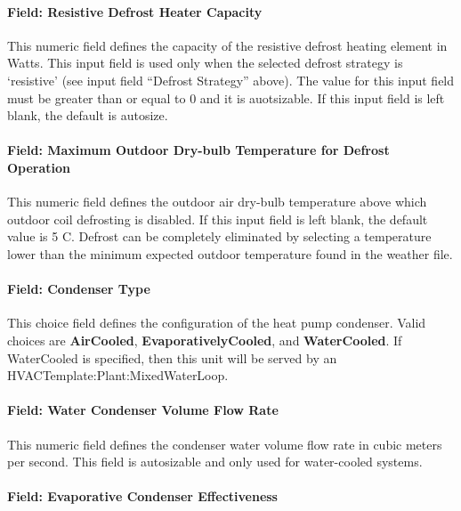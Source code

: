 \paragraph{Field: Resistive Defrost Heater Capacity}\label{field-resistive-defrost-heater-capacity-000}

This numeric field defines the capacity of the resistive defrost heating element in Watts. This input field is used only when the selected defrost strategy is `resistive' (see input field ``Defrost Strategy'' above). The value for this input field must be greater than or equal to 0 and it is auotsizable. If this input field is left blank, the default is autosize.

\paragraph{Field: Maximum Outdoor Dry-bulb Temperature for Defrost Operation}\label{field-maximum-outdoor-dry-bulb-temperature-for-defrost-operation-000}

This numeric field defines the outdoor air dry-bulb temperature above which outdoor coil defrosting is disabled. If this input field is left blank, the default value is 5 C. Defrost can be completely eliminated by selecting a temperature lower than the minimum expected outdoor temperature found in the weather file.

\paragraph{Field: Condenser Type}\label{field-condenser-type-000}

This choice field defines the configuration of the heat pump condenser. Valid choices are \textbf{AirCooled}, \textbf{EvaporativelyCooled}, and \textbf{WaterCooled}. If WaterCooled is specified, then this unit will be served by an HVACTemplate:Plant:MixedWaterLoop.

\paragraph{Field: Water Condenser Volume Flow Rate}\label{field-water-condenser-volume-flow-rate}

This numeric field defines the condenser water volume flow rate in cubic meters per second. This field is autosizable and only used for water-cooled systems.

\paragraph{Field: Evaporative Condenser Effectiveness}\label{field-evaporative-condenser-effectiveness-000}


